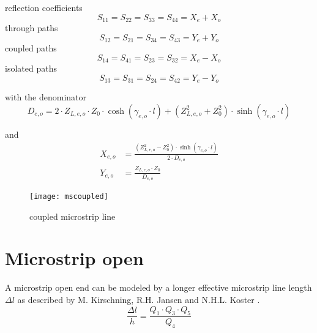 \addvspace{12pt}

reflection coefficients
\begin{equation}
S_{11} = S_{22} = S_{33} = S_{44} = X_e + X_o
\end{equation}
through paths
\begin{equation}
S_{12} = S_{21} = S_{34} = S_{43} = Y_e + Y_o
\end{equation}
coupled paths
\begin{equation}
S_{14} = S_{41} = S_{23} = S_{32} = X_e - X_o
\end{equation}
isolated paths
\begin{equation}
S_{13} = S_{31} = S_{24} = S_{42} = Y_e - Y_o
\end{equation}

with the denominator
\begin{equation}
D_{e,o} = 2\cdot Z_{L,e,o}\cdot Z_0\cdot \cosh(\gamma_{e,o}\cdot l)
         + \left(Z_{L,e,o}^2 + Z_0^2\right)\cdot \sinh\left(\gamma_{e,o}\cdot l\right)
\end{equation}

and
\begin{align}
X_{e,o} &= \frac{\left(Z_{L,e,o}^2 - Z_0^2\right)\cdot \sinh\left(\gamma_{e,o}\cdot l\right)}{2\cdot D_{e,o}}\\
Y_{e,o} &= \frac{Z_{L,e,o}\cdot Z_0}{D_{e,o}}
\end{align}

\begin{figure}[ht]
\begin{center}
\texttt{[image: mscoupled]}
\end{center}
\caption{coupled microstrip line}
\label{fig:mscoupled}
\end{figure}
\FloatBarrier

\section{Microstrip open}

A microstrip open end can be modeled by a longer effective microstrip
line length $\Delta l$ as described by M. Kirschning, R.H. Jansen and
N.H.L. Koster \cite{Kirschning7}.
\begin{equation}
\frac{\Delta l}{h} = \frac{Q_1\cdot Q_3\cdot Q_5}{Q_4}
\end{equation}

